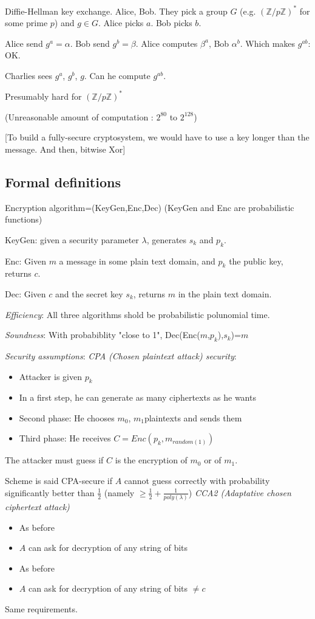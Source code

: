 \documentclass[11pt]{article}
\begin{document}
Diffie-Hellman key exchange.
Alice, Bob. They pick a group $G$ (e.g. $(\mathbb{Z}/p \mathbb{Z})^*$ for some prime $p$) and $g \in G$.
Alice picks $a$. Bob picks $b$.

Alice send $g^a=\alpha$. Bob send $g^b=\beta$.
Alice computes $\beta^a$, Bob $\alpha^b$.
Which makes $g^{a b}$: OK.

Charlies sees $g^a$, $g^b$, $g$. Can he compute $g^{a b}$.

Presumably hard for $(\mathbb{Z}/p \mathbb{Z})^*$

(Unreasonable amount of computation : $2^{80}$ to $2^{128}$)

[To build a fully-secure cryptosystem, we would have to use a key longer than the message. And then, bitwise Xor]

\subsection{Formal definitions}

Encryption algorithm=(KeyGen,Enc,Dec) (KeyGen and Enc are probabilistic functions)

KeyGen: given a security parameter $\lambda$, generates $s_k$ and $p_k$.

Enc: Given $m$ a message in some plain text domain, and $p_k$ the public key, returns $c$.

Dec: Given $c$ and the secret key $s_k$, returns $m$ in the plain text domain.

\textit{Efficiency}: All three algorithms shold be probabilistic polunomial time.

\textit{Soundness}: With probabiblity "close to 1", Dec(Enc($m$,$p_k$),$s_k$)=$m$

\textit{Security assumptions}:
\textit{CPA (Chosen plaintext attack) security}:
\begin{itemize}
\item Attacker is given $p_k$
\item In a first step, he can generate as many ciphertexts as he wants
\item Second phase: He chooses $m_0$, $m_1$plaintexts and sends them
\item Third phase: He receives $C=Enc(p_k,m_{random(1)})$
\end{itemize}
The attacker must guess if $C$ is the encryption of $m_0$ or of $m_1$.

Scheme is said CPA-secure if $A$ cannot guess correctly with probability significantly better than $\frac{1}{2}$ (namely $\geq \frac{1}{2}+\frac{1}{poly(\lambda)}$)
\textit{CCA2 (Adaptative chosen ciphertext attack)}
\begin{itemize}
\item As before
\item $A$ can ask for decryption of any string of bits
\item As before
\item $A$ can ask for decryption of any string of bits $\neq c$
\end{itemize}
Same requirements.
\end{document}
